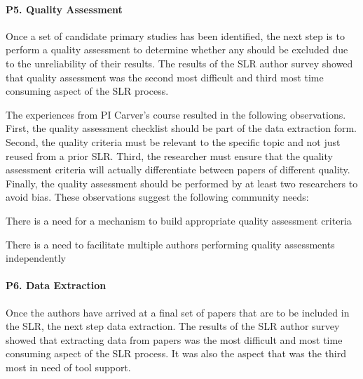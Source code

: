 \paragraph{P5. Quality Assessment}

Once a set of candidate primary studies has been identified, the next step is to perform a quality assessment to determine whether any should be excluded due to the unreliability of their results. The results of the SLR author survey showed that quality assessment was the second most difficult and third most time consuming aspect of the SLR process.

The experiences from PI Carver's course resulted in the following observations. First, the quality assessment checklist should be part of the data extraction form. Second, the quality criteria must be relevant to the specific topic and not just reused from a prior SLR. Third, the researcher must ensure that the quality assessment criteria will actually differentiate between papers of different quality. Finally, the quality assessment should be performed by at least two researchers to avoid bias. These observations suggest the following community needs:

\vspace*{-4pt}
\begin{itemize*}
\begin{bfseries}
\item There is a need for a mechanism to build appropriate quality assessment criteria
\item There is a need to facilitate multiple authors performing quality assessments independently
\end{bfseries}
\end{itemize*}
\vspace*{-4pt}

\paragraph{P6. Data Extraction}


Once the authors have arrived at a final set of papers that are to be included in the SLR, the next step data extraction. The results of the SLR author survey showed that extracting data from papers was the most difficult and most time consuming aspect of the SLR process. It was also the aspect that was the third most in need of tool support.

